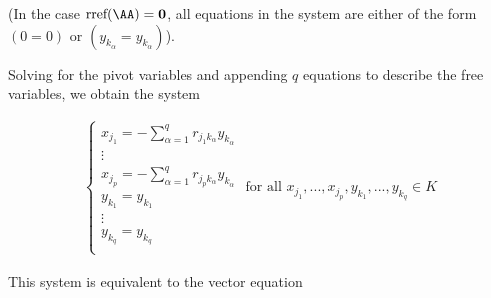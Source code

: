 \begin{deriv}
    (In the case $\rref(\AA) = \mathbf{0}$, all equations in the system are either of the form $(0 = 0)$ or $(y_{k_\alpha} = y_{k_\alpha})$).

    Solving for the pivot variables and appending $q$ equations to describe the free variables, we obtain the system

    \begin{align*}
        \begin{cases}
            x_{j_1} = -\sum_{\alpha = 1}^q r_{j_1 k_\alpha} y_{k_\alpha} \\
            \vdots \\
            x_{j_p} = -\sum_{\alpha = 1}^q r_{j_p k_\alpha} y_{k_\alpha}  \\
            y_{k_1} = y_{k_1} \\
            \vdots \\
            y_{k_q} = y_{k_q} \\
        \end{cases}
        \text{ for all $x_{j_1}, ..., x_{j_p}, y_{k_1}, ..., y_{k_q} \in K$}
    \end{align*}

    This system is equivalent to the vector equation


\end{deriv}
